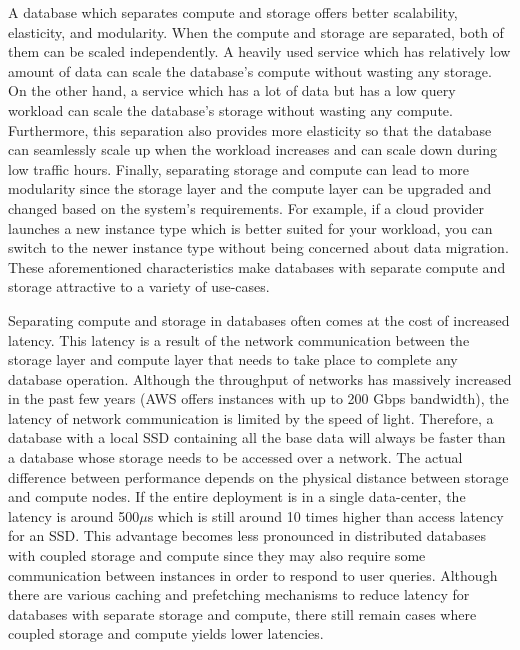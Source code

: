 \medskip
A database which separates compute and storage offers better scalability,
elasticity, and modularity. When the compute and storage are
separated, both of them can be scaled independently. A heavily used service
which has relatively low amount of data can scale the database's compute without
wasting any storage. On the other hand, a service which has a lot of data but
has a low query workload can scale the database's storage without wasting any
compute. Furthermore, this separation also provides more elasticity so that the
database can seamlessly scale up when the workload increases and can scale down
during low traffic hours. Finally, separating storage and compute can lead to
more modularity since the storage layer and the compute layer can be upgraded
and changed based on the system's requirements. For example, if a cloud provider
launches a new instance type which is better suited for your workload, you can
switch to the newer instance type without being concerned about data migration.
These aforementioned characteristics make databases with separate compute and
storage attractive to a variety of use-cases.

\medskip
Separating compute and storage in databases often comes at the cost of increased
latency. This latency is a result of the network communication between the
storage layer and compute layer that needs to take place to complete any
database operation. Although the throughput of networks has massively increased
in the past few years (AWS offers instances with up to 200 Gbps bandwidth), the
latency of network communication is limited by the speed of light. Therefore, a
database with a local SSD containing all the base data will always be faster
than a database whose storage needs to be accessed over a network. The actual
difference between performance depends on the physical distance between storage
and compute nodes. If the entire deployment is in a single data-center, the
latency is around 500$\mu$s which is still around 10 times higher than access latency
for an SSD\cite{jiang2021fusionraid}. This advantage becomes less pronounced in
distributed databases with coupled storage and compute since they may also require
some communication between instances in order to respond to user queries.
Although there are various caching and prefetching mechanisms to reduce latency
for databases with separate storage and compute, there still remain cases where
coupled storage and compute yields lower latencies.


